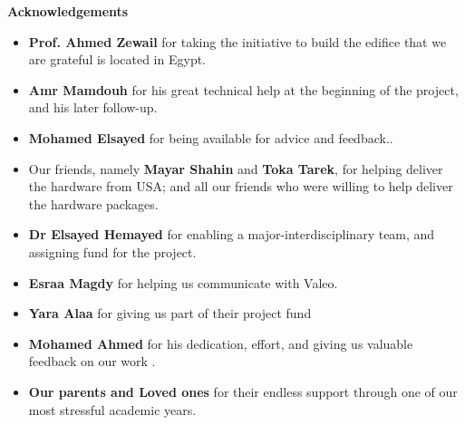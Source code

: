 \thispagestyle{plain}

\begin{center}
 \Large
    \textbf{Acknowledgements}
    
\large
\begin{itemize}
 \item \textbf{Prof. Ahmed Zewail} for taking the initiative to build the edifice that we are grateful is located in Egypt.
  \item  \textbf{Amr Mamdouh} for his great technical help at the beginning of the project, and his later follow-up.
  \item \textbf{Mohamed Elsayed} for being available for advice and feedback..
  \item Our friends, namely \textbf{Mayar Shahin} and \textbf{Toka Tarek}, for helping deliver the hardware from USA; and all our friends who were willing to help deliver the hardware packages.
  \item \textbf{Dr Elsayed Hemayed} for enabling a major-interdisciplinary team, and assigning fund for the project.
 
  \item \textbf{Esraa Magdy} for helping us communicate with Valeo.
  \item \textbf{Yara Alaa} for giving us part of their project fund
  \item\textbf{Mohamed Ahmed} for his dedication, effort, and giving us valuable feedback on our work . 
  \item \textbf{Our parents and Loved ones} for their endless support through one of our most stressful academic years. 

  
\end{itemize}
\end{center}
\break